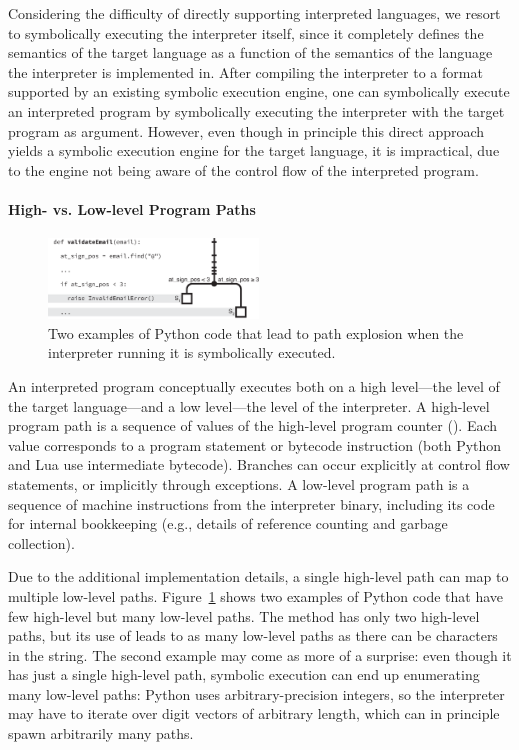 Considering the difficulty of directly supporting interpreted languages, we resort to symbolically executing the interpreter itself, since it completely defines the semantics of the target language as a function of the semantics of the language the interpreter is implemented in.
%
After compiling the interpreter to a format supported by an existing symbolic execution engine, one can symbolically execute an interpreted program by symbolically executing the interpreter with the target program as argument.
%
However, even though in principle this direct approach yields a symbolic execution engine for the target language, it is impractical, due to the engine not being aware of the control flow of the interpreted program.

\paragraph{High- vs. Low-level Program Paths}

\begin{figure}
  \centering
  \includegraphics[width=2.2in]{figures/chef/running-example}
  \caption{Two examples of Python code that lead to path explosion when the interpreter running it is symbolically executed.}
  \label{fig:running-examples}
\end{figure}


An interpreted program conceptually executes both on a high level---the level of the target language---and a low level---the level of the interpreter.
%
A high-level program path is a sequence of values of the high-level program counter (\hlpc). Each \hlpc value corresponds to a program statement or bytecode instruction (both Python and Lua use intermediate bytecode).  Branches can occur explicitly at control flow statements, or implicitly through exceptions.
%
A low-level program path is a sequence of machine instructions from the interpreter binary, including its code for internal bookkeeping (e.g., details of reference counting and garbage collection).

Due to the additional implementation details, a single high-level path can map to multiple low-level paths.
%
Figure~\ref{fig:running-examples} shows two examples of Python code that have few high-level but many low-level paths. The  method has only two high-level paths, but its use of  leads to as many low-level paths as there can be characters in the  string.
%
The second example  may come as more of a surprise: even though it has just a single high-level path, symbolic execution can end up enumerating many low-level paths: Python uses arbitrary-precision integers, so the interpreter may have to iterate over digit vectors of arbitrary length, which can in principle spawn arbitrarily many paths.


